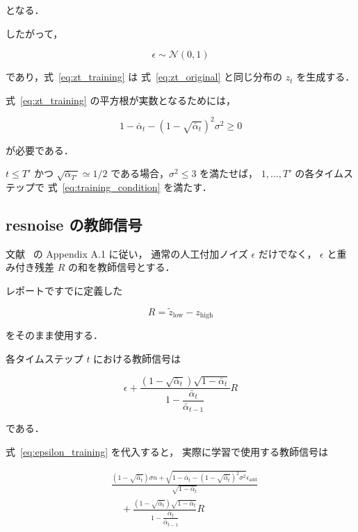 \documentclass[a4paper,10pt,twocolumn]{ltjsarticle}
\begin{document}
となる．

したがって，

\[
\epsilon\sim\mathcal{N}(0,1)
\]

であり，式~\eqref{eq:zt_training} は
式~\eqref{eq:zt_original} と同じ分布の $z_t$ を生成する．

式~\eqref{eq:zt_training} の平方根が実数となるためには，

\begin{equation}
1-\bar{\alpha}_t
-
\left(
1-\sqrt{\bar{\alpha}_t}
\right)^2
\sigma^2
\geq 0
\label{eq:training_condition}
\end{equation}

が必要である．

$t\leq T'$ かつ
$\sqrt{\bar{\alpha}_{T'}}\simeq 1/2$
である場合，$\sigma^2\leq 3$ を満たせば，
$1,\ldots,T'$ の各タイムステップで
式~\eqref{eq:training_condition} を満たす．

\subsection{resnoise の教師信号}

文献~\cite{resfusion} の Appendix A.1 に従い，
通常の人工付加ノイズ $\epsilon$ だけでなく，
$\epsilon$ と重み付き残差 $R$ の和を教師信号とする．

レポートですでに定義した

\[
R
=
\tilde z_{\mathrm{low}}
-
z_{\mathrm{high}}
\]

をそのまま使用する．

各タイムステップ $t$ における教師信号は

\begin{equation}
\boxed{
\epsilon
+
\frac{
\left(
1-\sqrt{\bar{\alpha}_t}
\right)
\sqrt{1-\bar{\alpha}_t}
}{
1-
\dfrac{
\bar{\alpha}_t
}{
\bar{\alpha}_{t-1}
}
}
R
}
\label{eq:resnoise_target}
\end{equation}

である．

式~\eqref{eq:epsilon_training} を代入すると，
実際に学習で使用する教師信号は

\begin{equation}
\boxed{
\begin{aligned}
&
\frac{
\left(
1-\sqrt{\bar{\alpha}_t}
\right)
\sigma n
+
\sqrt{
1-\bar{\alpha}_t
-
\left(
1-\sqrt{\bar{\alpha}_t}
\right)^2
\sigma^2
}
\epsilon_{\mathrm{add}}
}{
\sqrt{1-\bar{\alpha}_t}
}
\\
&\quad+
\frac{
\left(
1-\sqrt{\bar{\alpha}_t}
\right)
\sqrt{1-\bar{\alpha}_t}
}{
1-
\dfrac{
\bar{\alpha}_t
}{
\bar{\alpha}_{t-1}
}
}
R
\end{aligned}
}
\label{eq:resnoise_target_expanded}
\end{equation}
\end{document}
